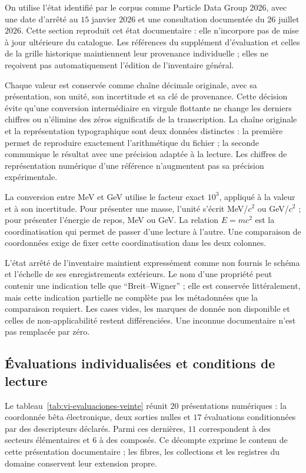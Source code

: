 On utilise l’état identifié par le corpus comme Particle Data Group
2026, avec une date d’arrêté au \(15\) janvier \(2026\) et une consultation
documentée du \(26\) juillet \(2026\). Cette section reproduit cet
état documentaire : elle n’incorpore pas de mise à jour ultérieure du catalogue.
Les références du supplément d’évaluation et celles de la grille historique
maintiennent leur provenance individuelle ; elles ne reçoivent pas automatiquement l’édition
de l’inventaire général.


Chaque valeur est conservée comme chaîne décimale originale, avec sa
présentation, son unité, son incertitude et sa clé de provenance. Cette décision
évite qu’une conversion intermédiaire en virgule flottante ne change les derniers
chiffres ou n’élimine des zéros significatifs de la transcription. La chaîne
originale et la représentation typographique sont deux données distinctes : la
première permet de reproduire exactement l’arithmétique du fichier ; la
seconde communique le résultat avec une précision adaptée à la lecture.
Les chiffres de représentation numérique d’une référence n’augmentent pas sa
précision expérimentale.


La conversion entre MeV et GeV utilise le facteur exact \(10^3\), appliqué
à la valeur et à son incertitude. Pour présenter une masse, l’unité s’écrit
MeV/\(c^2\) ou GeV/\(c^2\) ; pour présenter l’énergie de repos,
MeV ou GeV. La relation \(E=mc^2\) est la coordinatisation qui permet de passer d’une
lecture à l’autre. Une comparaison de coordonnées exige de fixer cette coordinatisation dans
les deux colonnes.


L’état arrêté de l’inventaire maintient expressément comme non fournis le
schéma et l’échelle de ses enregistrements extérieurs. Le nom d’une propriété
peut contenir une indication telle que ``Breit--Wigner'' ; elle est conservée littéralement,
mais cette indication partielle ne complète pas les métadonnées que la comparaison
requiert. Les cases vides, les marques de donnée non disponible et celles de
non-applicabilité restent différenciées. Une inconnue documentaire
n’est pas remplacée par zéro.


\subsection{Évaluations individualisées et conditions de lecture
}
\label{subsec:vi-evaluaciones-documentadas}

Le tableau~\ref{tab:vi-evaluaciones-veinte} réunit \(20\) présentations
numériques : la coordonnée bêta électronique, deux sorties nulles et
\(17\) évaluations conditionnées par des descripteurs déclarés. Parmi
ces dernières, \(11\) correspondent à des secteurs élémentaires et \(6\) à des
composés. Ce décompte exprime le contenu de cette présentation documentaire ;
les fibres, les collections et les registres du domaine conservent leur extension propre.


